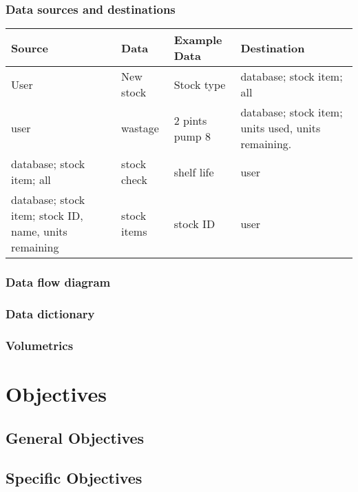 \subsubsection{Data sources and destinations}
\begin{center}
\begin{tabular}{|l|l|l|l|}
    \hline
    \textbf{Source} & \textbf{Data} & \textbf{Example Data} & \textbf{Destination} \\ \hline
	User & New stock & Stock type & database; stock item; all \\ \hline
	user & wastage & 2 pints pump 8 &database; stock item; units used, units remaining. \\ \hline
	database; stock item; all & stock check & shelf life & user \\ \hline
	database; stock item; stock ID, name, units remaining & stock items & stock ID & user \\ \hline
	
	
    
\end{tabular}
\label{tab:range_examples}
\end{center}

\subsubsection{Data flow diagram}

\subsubsection{Data dictionary}

\subsubsection{Volumetrics}

\section{Objectives}

\subsection{General Objectives}

\subsection{Specific Objectives}

